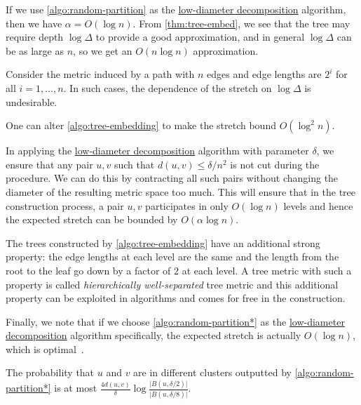 If we use \autoref{algo:random-partition} as the \hyperref[def:low-diameter-decomposition]{low-diameter decomposition} algorithm, then we have \(\alpha = O(\log n)\). From \autoref{thm:tree-embed}, we see that the tree may require depth \(\log \Delta \) to provide a good approximation, and in general \(\log \Delta \) can be as large as \(n\), so we get an \(O(n \log n)\) approximation.

\begin{eg}
  Consider the metric induced by a path with \(n\) edges and edge lengths are \(2^i\) for all \(i = 1, \dots , n\). In such cases, the dependence of the stretch on \(\log \Delta \) is undesirable.
\end{eg}

\begin{remark}
  One can alter \autoref{algo:tree-embedding} to make the stretch bound \(O(\log ^2 n)\).
\end{remark}
\begin{explanation}
  In applying the \hyperref[def:low-diameter-decomposition]{low-diameter decomposition} algorithm with parameter \(\delta \), we ensure that any pair \(u, v\) such that \(d(u, v) \leq \delta / n^2\) is not cut during the procedure. We can do this by contracting all such pairs without changing the diameter of the resulting metric space too much. This will ensure that in the tree construction process, a pair \(u, v\) participates in only \(O(\log n)\) levels and hence the expected stretch can be bounded by \(O(\alpha \log n)\).
\end{explanation}

\begin{remark}
  The trees constructed by \autoref{algo:tree-embedding} have an additional strong property: the edge lengths at each level are the same and the length from the root to the leaf go down by a factor of \(2\) at each level. A tree metric with such a property is called \emph{hierarchically well-separated} tree metric and this additional property can be exploited in algorithms and comes for free in the construction.
\end{remark}

Finally, we note that if we choose \autoref{algo:random-partition*} as the \hyperref[def:low-diameter-decomposition]{low-diameter decomposition} algorithm specifically, the expected stretch is actually \(O(\log n)\), which is optimal~\cite{fakcharoenphol2003tight}.

\begin{prev}
  The probability that \(u\) and \(v\) are in different clusters outputted by \autoref{algo:random-partition*} is at most \(\frac{4 d(u, v)}{\delta } \log \frac{\lvert B(u, \delta / 2) \rvert }{\lvert B(u, \delta / 8) \rvert }\).
\end{prev}


